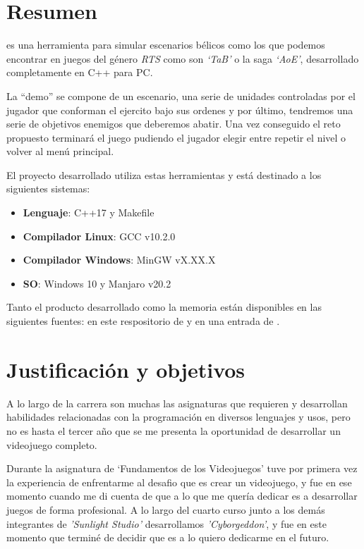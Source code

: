\chapter*{Resumen}
\label{Resumen}

 es una herramienta para simular escenarios 
bélicos como los que podemos encontrar en juegos del género \textit{\ac{RTS}} como son
\textit{`\ac{TaB}'} o la saga \textit{`\ac{AoE}'}, desarrollado
completamente en C++ para \ac{PC}.

La ``demo'' se compone de un escenario, una serie de unidades controladas por el jugador
que conforman el ejercito bajo sus ordenes y por último, tendremos una serie de objetivos enemigos
que deberemos abatir. Una vez conseguido el reto propuesto terminará el juego pudiendo el jugador elegir 
entre repetir el nivel o volver al menú principal.

El proyecto desarrollado utiliza estas herramientas y está destinado a los siguientes
sistemas:
\begin{itemize}
	\item \textbf{Lenguaje}: C++17 y Makefile
	\item \textbf{Compilador Linux}: GCC v10.2.0
	\item \textbf{Compilador Windows}: MinGW vX.XX.X
	\item \textbf{SO}: Windows 10 y Manjaro v20.2
\end{itemize}

Tanto el producto desarrollado como la memoria están disponibles en las siguientes fuentes: 
en este respositorio de \citeauthor*{BPW_GitHub_2021} y en una entrada de \citeauthor*{BPW_Archive_2021}. 

\chapter*{Justificación y objetivos}
A lo largo de la carrera son muchas las asignaturas que requieren y desarrollan
habilidades relacionadas con la programación en diversos lenguajes y usos, 
pero no es hasta el tercer año que se me presenta la oportunidad de desarrollar
un videojuego completo. 

Durante la asignatura de `Fundamentos de los Videojuegos' tuve por primera vez
la experiencia de enfrentarme al desafio que es crear un videojuego, y fue en ese
momento cuando me di cuenta de que a lo que me quería dedicar es a
desarrollar juegos de forma profesional. A lo largo del cuarto curso junto a los demás
integrantes de \textit{'Sunlight Studio'} desarrollamos \textit{'Cyborgeddon'}, y fue
en este momento que terminé de decidir que es a lo quiero dedicarme en el futuro.


